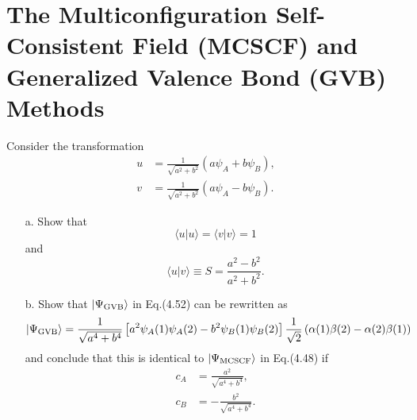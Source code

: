 \documentclass[a4paper]{book}
\newcounter{exercise}[chapter]
\begin{document}
	\section{The Multiconfiguration Self-Consistent Field (MCSCF) and \texorpdfstring{\\}- Generalized Valence Bond (GVB) Methods}	
	
	\begin{exercise}
	Consider the transformation
	\begin{align*}
		u &= \frac{1}{\sqrt{ a^2 + b^2 }} \left( a \psi_A + b \psi_B \right), \\
		v &= \frac{1}{\sqrt{ a^2 + b^2 }} \left( a \psi_A - b \psi_B \right).
	\end{align*}
	\begin{enumerate}
	
	\item[a.] Show that
	\[
		\langle u | u \rangle = \langle v | v \rangle = 1
	\]
	and
	\[
		\langle u | v \rangle \equiv S = \frac{ a^2 - b^2 }{ a^2 + b^2 }.
	\]
	
	\item[b.] Show that $|\Psi_{\rm GVB}\rangle$ in Eq.(4.52) can be rewritten as
	\[
		|\Psi_{\rm GVB}\rangle = \frac{1}{\sqrt{ a^4 + b^4 }} \left[ a^2 \psi_A(1) \psi_A(2) - b^2 \psi_B(1) \psi_B(2) \right] \frac{1}{\sqrt{2}} \left( \alpha(1)\beta(2) - \alpha(2)\beta(1) \right)
	\]
	and conclude that this is identical to $|\Psi_{\rm MCSCF}\rangle$ in Eq.(4.48) if
	\begin{align*}
		c_A &= \frac{ a^2 }{ \sqrt{ a^4 + b^4 } }, \\
		c_B &= -\frac{ b^2 }{ \sqrt{ a^4 + b^4 } }.
	\end{align*}
	\end{enumerate}		
	\end{exercise}
	
\end{document}

